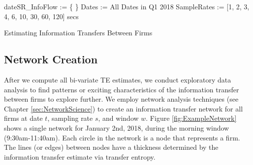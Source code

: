 \begin{algorithm}[H]

\SetAlgoLined

dateSR\_InfoFlow := \{ \} \;
Dates := All Dates in Q1 2018 \;
SampleRates := [1, 2, 3, 4,  6, 10, 30, 60, 120] secs \;


\caption{Estimating Information Transfers Between Firms}
\label{alg:EstIF}
\end{algorithm}


\subsection{Network Creation}
After we compute all bi-variate TE estimates, we conduct exploratory data analysis to find patterns or exciting characteristics of the information transfer between firms to explore further.   We employ network analysis techniques (see Chapter \ref{sec:NetworkScience}) to create an information transfer network for all firms at date $t$, sampling rate $s$, and window $w$.  Figure \ref{fig:ExampleNetwork} shows a single network for January 2nd,  2018, during the morning window (9:30am-11:40am).  Each circle in the network is a node that represents a firm. The lines (or edges) between nodes have a thickness determined by the information transfer estimate via transfer entropy. 


